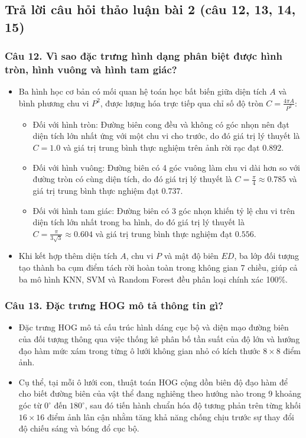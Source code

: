 \documentclass[12pt,a4paper]{article}
\begin{document}
\subsection{Trả lời câu hỏi thảo luận bài 2 (câu 12, 13, 14, 15)}

\subsubsection*{Câu 12. Vì sao đặc trưng hình dạng phân biệt được hình tròn, hình vuông và hình tam giác?}
\begin{itemize}
    \item Ba hình học cơ bản có mối quan hệ toán học bất biến giữa diện tích $A$ và bình phương chu vi $P^2$, được lượng hóa trực tiếp qua chỉ số độ tròn $C = \frac{4\pi A}{P^2}$:
    \begin{itemize}
        \item Đối với hình tròn: Đường biên cong đều và không có góc nhọn nên đạt diện tích lớn nhất ứng với một chu vi cho trước, do đó giá trị lý thuyết là $C = 1.0$ và giá trị trung bình thực nghiệm trên ảnh rời rạc đạt $0.892$.
        \item Đối với hình vuông: Đường biên có 4 góc vuông làm chu vi dài hơn so với đường tròn có cùng diện tích, do đó giá trị lý thuyết là $C = \frac{\pi}{4} \approx 0.785$ và giá trị trung bình thực nghiệm đạt $0.737$.
        \item Đối với hình tam giác: Đường biên có 3 góc nhọn khiến tỷ lệ chu vi trên diện tích lớn nhất trong ba hình, do đó giá trị lý thuyết là $C = \frac{\pi}{3\sqrt{3}} \approx 0.604$ và giá trị trung bình thực nghiệm đạt $0.556$.
    \end{itemize}
    \item Khi kết hợp thêm diện tích $A$, chu vi $P$ và mật độ biên $ED$, ba lớp đối tượng tạo thành ba cụm điểm tách rời hoàn toàn trong không gian 7 chiều, giúp cả ba mô hình KNN, SVM và Random Forest đều phân loại chính xác 100\%.
\end{itemize}

\subsubsection*{Câu 13. Đặc trưng HOG mô tả thông tin gì?}
\begin{itemize}
    \item Đặc trưng HOG mô tả cấu trúc hình dáng cục bộ và diện mạo đường biên của đối tượng thông qua việc thống kê phân bố tần suất của độ lớn và hướng đạo hàm mức xám trong từng ô lưới không gian nhỏ có kích thước $8 \times 8$ điểm ảnh.
    \item Cụ thể, tại mỗi ô lưới con, thuật toán HOG cộng dồn biên độ đạo hàm để cho biết đường biên của vật thể đang nghiêng theo hướng nào trong 9 khoảng góc từ $0^\circ$ đến $180^\circ$, sau đó tiến hành chuẩn hóa độ tương phản trên từng khối $16 \times 16$ điểm ảnh lân cận nhằm tăng khả năng chống chịu trước sự thay đổi độ chiếu sáng và bóng đổ cục bộ.
\end{itemize}
\end{document}
